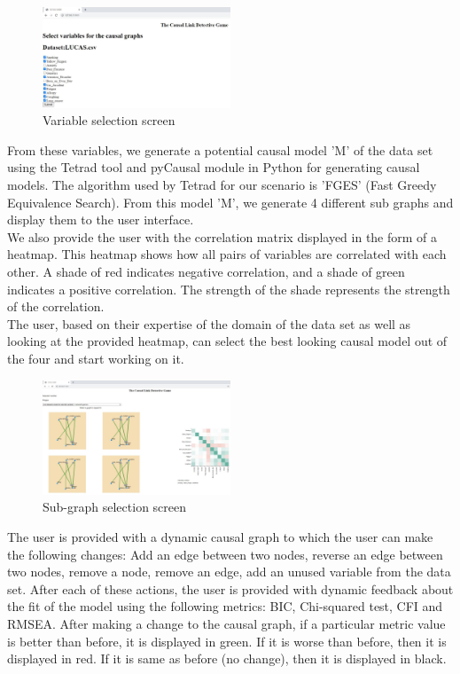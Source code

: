 \documentclass{vgtc}                          %
\begin{document}
\begin{figure}[H]
  \caption{Variable selection screen}
  \centering
  \includegraphics[width=0.5\textwidth]{s1}
\end{figure}


From these variables, we generate a potential causal model 'M' of the data set using the Tetrad tool and pyCausal module in Python for generating causal models. The algorithm used by Tetrad for our scenario is 'FGES' (Fast Greedy Equivalence Search). From this model 'M', we generate 4 different sub graphs and display them to the user interface. 
\\[1em]
We also provide the user with the correlation matrix displayed in the form of a heatmap. This heatmap shows how all pairs of variables are correlated with each other. A shade of red indicates negative correlation, and a shade of green indicates a positive correlation. The strength of the shade represents the strength of the correlation.
\\[1em]
The user, based on their expertise of the domain of the data set as well as looking at the provided heatmap, can select the best looking causal model out of the four and start working on it.

\begin{figure}[H]
  \caption{Sub-graph selection screen}
  \centering
  \includegraphics[width=0.5\textwidth]{s2}
\end{figure}


The user is provided with a dynamic causal graph to which the user can make the following changes:
Add an edge between two nodes, reverse an edge between two nodes, remove a node, remove an edge, add an unused variable from the data set.
After each of these actions, the user is provided with dynamic feedback about the fit of the model using the following metrics: BIC, Chi-squared test, CFI and RMSEA.
After making a change to the causal graph, if a particular metric value is better than before, it is displayed in green. If it is worse than before, then it is displayed in red. If it is same as before (no change), then it is displayed in black.
\\[1em]
\end{document}
